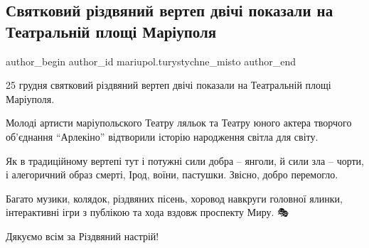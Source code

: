  
 
 
 
 

\subsection{Святковий різдвяний вертеп двічі показали на Театральній площі Маріуполя}
\label{sec:25_12_2021.fb.mariupol.turystychne_misto.2.rizdvo_vertep_teatralna_ploscha_mariupol}

\ifcmt
 author_begin
   author_id mariupol.turystychne_misto
 author_end
\fi

25 грудня святковий різдвяний вертеп двічі показали на Театральній площі
Маріуполя. 

Молоді артисти маріупольского Театру ляльок та Театру юного актера творчого
об'єднання \enquote{Арлекіно} відтворили історію народження світла для світу.

Як в традиційному вертепі тут і потужні сили добра – янголи, й сили зла –
чорти, і алегоричний образ смерті, Ірод, воїни, пастушки. Звісно, добро
перемогло.

Багато музики, колядок, різдвяних пісень, хоровод навкруги головної ялинки,
інтерактивні ігри з публікою та хода вздовж проспекту Миру. 🎭

Дякуємо всім за Різдвяний настрій!
